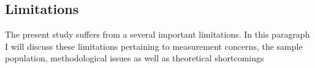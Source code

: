 %
%
%
%
%





\subsection{Limitations}
The present study suffers from a several important limitations.
In this paragraph I will discuss these limitations pertaining to measurement concerns,
the sample population, methodological issues as well as theoretical shortcomings 

